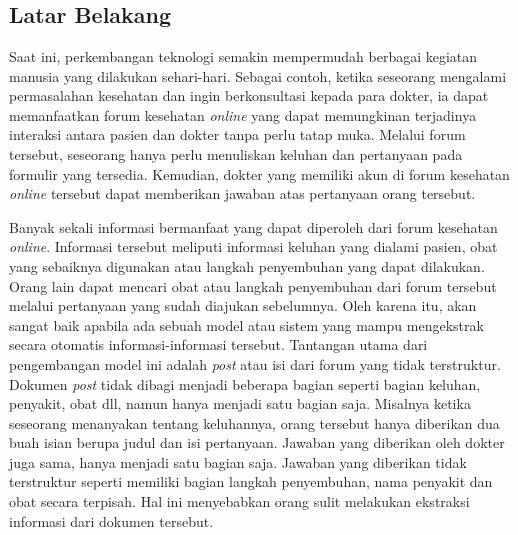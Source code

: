 \chapter{\babSatu}


\section{Latar Belakang}
	
	Saat ini, perkembangan teknologi semakin mempermudah berbagai kegiatan manusia yang dilakukan sehari-hari. Sebagai contoh, ketika seseorang mengalami permasalahan kesehatan dan ingin berkonsultasi kepada para dokter, ia dapat memanfaatkan forum kesehatan \textit{online} yang dapat memungkinan terjadinya interaksi antara pasien dan dokter tanpa perlu tatap muka.  Melalui forum tersebut, seseorang hanya perlu menuliskan keluhan dan pertanyaan pada formulir yang tersedia. Kemudian, dokter yang memiliki akun di forum kesehatan \textit{online} tersebut dapat memberikan jawaban atas pertanyaan orang tersebut.
	
	Banyak sekali informasi bermanfaat yang dapat diperoleh dari forum kesehatan \textit{online}. Informasi tersebut meliputi informasi keluhan yang dialami pasien, obat yang sebaiknya digunakan atau langkah penyembuhan yang dapat dilakukan. Orang lain dapat mencari obat atau langkah penyembuhan dari forum tersebut melalui pertanyaan yang sudah diajukan sebelumnya. Oleh karena itu, akan sangat baik apabila ada sebuah model atau sistem yang mampu mengekstrak secara otomatis informasi-informasi tersebut. Tantangan utama dari pengembangan model ini adalah \textit{post} atau isi dari forum yang tidak terstruktur. Dokumen \textit{post} tidak dibagi menjadi beberapa bagian seperti bagian keluhan, penyakit, obat dll, namun hanya menjadi satu bagian saja. Misalnya ketika seseorang menanyakan tentang keluhannya, orang tersebut hanya diberikan dua buah isian berupa judul dan isi pertanyaan. Jawaban yang diberikan oleh dokter juga sama, hanya menjadi satu bagian saja. Jawaban yang diberikan tidak terstruktur seperti memiliki bagian langkah penyembuhan, nama penyakit dan obat secara terpisah. Hal ini menyebabkan orang sulit melakukan ekstraksi informasi dari dokumen tersebut.
	
